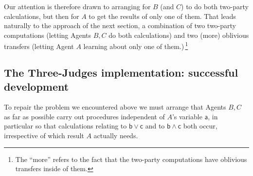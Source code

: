 \documentclass[runningheads]{llncs}
\newcommand\Va {\mathsf{a}}
\newcommand\Vb {\mathsf{b}}
\newcommand\Vc {\mathsf{c}}
\begin{document}
Our attention is therefore drawn to arranging for $B$ (and $C$) to do both two-party calculations, but then for $A$ to get the results of only one of them. That leads naturally to the approach of the next section, a combination of two two-party computations (letting Agents $B,C$ do both calculations) and two (more) oblivious transfers (letting Agent $A$ learning about only one of them.)\,\footnote{The ``more'' refers to the fact that the two-party computations have oblivious transfers inside of them.}

\subsection{The Three-Judges implementation: successful development}\label{s1323}

To repair the problem we encountered above we must arrange that Agents $B,C$ as far as possible carry out procedures independent of $A$'s variable $\Va$, in particular so that calculations relating to $\Vb\lor \Vc$ and to $\Vb\land \Vc$ both occur, irrespective of which result $A$ actually needs.
\end{document}
